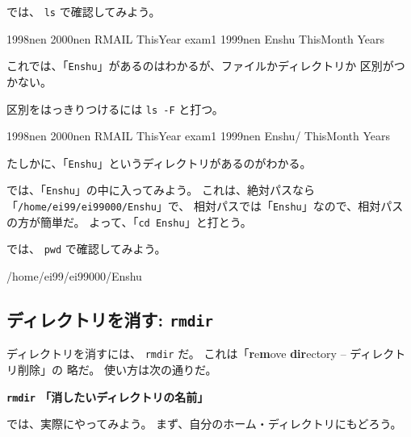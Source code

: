 では、 \texttt{ls} で確認してみよう。

\begin{progls}
1998nen         2000nen         RMAIL           ThisYear       exam1
1999nen         Enshu           ThisMonth       Years
%
\end{progls}

これでは、「\texttt{Enshu}」があるのはわかるが、ファイルかディレクトリか
区別がつかない。

区別をはっきりつけるには \texttt{ls -F} と打つ。

\begin{progls}
1998nen         2000nen         RMAIL           ThisYear       exam1
1999nen         Enshu/          ThisMonth       Years
%
\end{progls}

たしかに、「\texttt{Enshu}」というディレクトリがあるのがわかる。

では、「\texttt{Enshu}」の中に入ってみよう。
これは、絶対パスなら「\texttt{/home/ei99/ei99000/Enshu}」で、
相対パスでは「\texttt{Enshu}」なので、相対パスの方が簡単だ。
よって、「\texttt{cd Enshu}」と打とう。

\begin{progls}
%
\end{progls}

では、 \texttt{pwd} で確認してみよう。

\begin{progls}
/home/ei99/ei99000/Enshu
%
\end{progls}

\subsection{ディレクトリを消す: \texttt{rmdir}}

ディレクトリを消すには、 \texttt{rmdir} だ。
これは「\textbf{r}e\textbf{m}ove \textbf{dir}ectory -- ディレクトリ削除」の
略だ。
使い方は次の通りだ。

\begin{center}
\begin{minipage}{10cm}
\begin{shadebox}
\smallskip
{\Large\bf \texttt{rmdir} 「消したいディレクトリの名前」}
\smallskip
\end{shadebox}
\end{minipage}
\end{center}

では、実際にやってみよう。
まず、自分のホーム・ディレクトリにもどろう。

